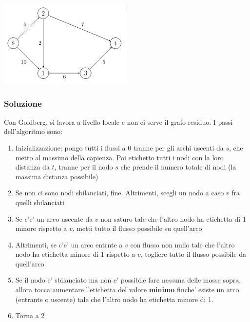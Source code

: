 \begin{center}
  \includegraphics[width=0.5\textwidth]{img/2025-04-07-19-57-28.png}
\end{center}

\subsubsection{Soluzione}
Con Goldberg, si lavora a livello locale e non ci serve il grafo residuo. I passi dell'algoritmo sono:
\begin{enumerate}
  \item Inizializzazione: pongo tutti i flussi a 0 tranne per gli archi uscenti da $ s $, che metto al massimo della capienza. Poi etichetto tutti i nodi con la loro distanza da $ t $, tranne per il nodo $ s  $ che prende il numero totale di nodi (la massima distanza possibile)
  \item Se non ci sono nodi sbilanciati, fine. Altrimenti, scegli un nodo a caso $ v $ fra quelli sbilanciati
  \item Se c'e' un arco uscente da $ v $ non saturo tale che l'altro nodo ha etichetta di 1 minore rispetto a $ v $, metti tutto il flusso possibile su quell'arco
  \item Altrimenti, se c'e' un arco entrnte a $ v $ con flusso non nullo tale che l'altro nodo ha etichetta minore di 1 rispetto a $ v $, togliere tutto il flusso possibile da quell'arco
  \item Se il nodo e' sbilanciato ma non e' possibile fare nessuna delle mosse sopra, allora tocca aumentare l'etichetta del valore \textbf{minimo} finche' esiste un arco (entrante o uscente) tale che l'altro nodo ha etichetta minore di 1.
  \item Torna a 2
\end{enumerate}

